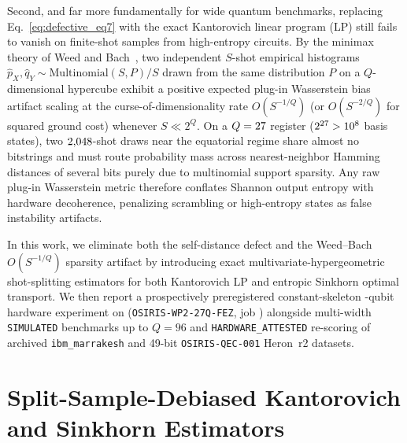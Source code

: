 \documentclass[aps,prapplied,reprint,longbibliography]{revtex4-2}
\begin{document}
Second, and far more fundamentally for wide quantum benchmarks, replacing Eq.~\eqref{eq:defective_eq7} with the exact Kantorovich linear program (LP) still fails to vanish on finite-shot samples from high-entropy circuits. By the minimax theory of Weed and Bach~\cite{weed2019sharp}, two independent $S$-shot empirical histograms $\hat{p}_X, \hat{q}_Y \sim \mathrm{Multinomial}(S, P)/S$ drawn from the same distribution $P$ on a $Q$-dimensional hypercube exhibit a positive expected plug-in Wasserstein bias artifact scaling at the curse-of-dimensionality rate $O(S^{-1/Q})$ (or $O(S^{-2/Q})$ for squared ground cost) whenever $S \ll 2^Q$. On a $Q=27{}$ register ($2^{27{}} > 10^8$ basis states), two $2{,}048{}$-shot draws near the equatorial regime share almost no bitstrings and must route probability mass across nearest-neighbor Hamming distances of several bits purely due to multinomial support sparsity. Any raw plug-in Wasserstein metric therefore conflates Shannon output entropy with hardware decoherence, penalizing scrambling or high-entropy states as false instability artifacts.

In this work, we eliminate both the self-distance defect and the Weed--Bach $O(S^{-1/Q})$ sparsity artifact by introducing exact multivariate-hypergeometric shot-splitting estimators for both Kantorovich LP and entropic Sinkhorn optimal transport. We then report a prospectively preregistered constant-skeleton \WpFezQubits{}-qubit hardware experiment on \texttt{\WpFezBackend{}} (\texttt{OSIRIS-WP2-27Q-FEZ}, job \texttt{\WpFezJobId{}}) alongside multi-width \texttt{SIMULATED} benchmarks up to $Q=96$ and \texttt{HARDWARE\_ATTESTED} re-scoring of archived \texttt{ibm\_marrakesh} and 49-bit \texttt{OSIRIS-QEC-001} Heron~r2 datasets.

\section{Split-Sample-Debiased Kantorovich and Sinkhorn Estimators}
\label{sec:estimators}
\end{document}
